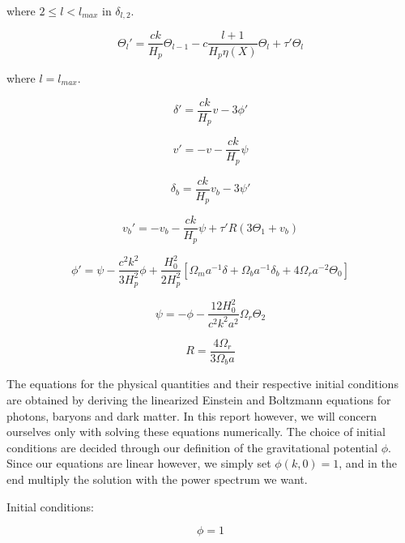 \documentclass[norsk,a4paper,12pt]{article}
\begin{document}
where $ 2 \leq l < l_{max} $ in $ \delta_{l,2} $.

\begin{equation}
 \Theta_l' = \frac{ck}{H_p}\Theta_{l-1} - c\frac{l+1}{H_p\eta(X)}\Theta_l + \tau'\Theta_l
\end{equation}

where $l = l_{max}$.

\begin{equation}
 \delta' = \frac{ck}{H_p}v - 3\phi'
\end{equation}

\begin{equation}
 v' = -v-\frac{ck}{H_p}\psi
\end{equation}

\begin{equation}
 \delta_b = \frac{ck}{H_p}v_b - 3\psi'
\end{equation}

\begin{equation}
 v_b' = -v_b - \frac{ck}{H_p}\psi + \tau'R(3\Theta_1 + v_b)
\end{equation}

\begin{equation}
 \phi' = \psi - \frac{c^2k^2}{3H_p^2}\phi + \frac{H_0^2}{2H_p^2}[\Omega_m a^{-1}\delta + \Omega_b a^{-1}\delta_b + 4\Omega_ra^{-2}\Theta_0]
\end{equation}

\begin{equation}
 \psi = -\phi - \frac{12H_0^2}{c^2k^2a^2}\Omega_r\Theta_2
\end{equation}

\begin{equation}
 R = \frac{4\Omega_r}{3\Omega_b a}
\end{equation}


The equations for the physical quantities and their respective initial conditions are obtained by deriving the linearized Einstein and Boltzmann equations for photons, baryons and dark matter. In this report however, we will concern ourselves only with solving these equations numerically. The choice of initial conditions are decided through our definition of the gravitational potential $\phi$. Since our equations are linear however, we simply set $\phi(k,0)=1$, and in the end multiply the solution with the power spectrum we want. 

Initial conditions:

\begin{equation}
 \phi = 1
\end{equation}
\end{document}
